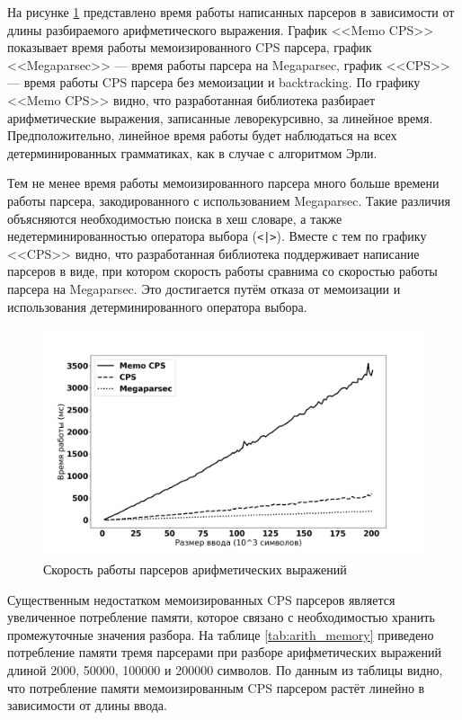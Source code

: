 \documentclass[times]{itmo-student-thesis}
\begin{document}
На рисунке \ref{fig:expr_plot} представлено время работы написанных парсеров в зависимости от длины разбираемого
арифметического выражения. График <<Memo CPS>> показывает время работы мемоизированного CPS парсера, график
<<Megaparsec>> --- время работы  парсера на Megaparsec,  график <<CPS>> --- время работы CPS парсера без мемоизации и
backtracking. По графику <<Memo CPS>> видно, что разработанная библиотека разбирает арифметические выражения, записанные 
леворекурсивно, за линейное время. Предположительно, линейное время работы будет наблюдаться на всех детерминированных грамматиках,
как в случае с алгоритмом Эрли.

Тем не менее время работы мемоизированного парсера много больше времени работы парсера,
закодированного с использованием Megaparsec. Такие различия объясняются необходимостью поиска в хеш словаре, а также 
недетерминированностью оператора выбора (\lstinline{<|>}). Вместе с тем по графику <<CPS>> видно, что разработанная библиотека
поддерживает написание парсеров в виде, при котором скорость работы сравнима со скоростью работы парсера на Megaparsec. Это
достигается путём отказа от мемоизации и использования детерминированного оператора выбора.

\begin{figure}[!h]
  \caption{Скорость работы парсеров арифметических выражений}\label{fig:expr_plot}
  \includegraphics[width=0.8\paperwidth]{./images/megaparsec_comparison.png}
\end{figure}

Существенным недостатком мемоизированных CPS парсеров является увеличенное потребление памяти, которое связано с
необходимостью хранить промежуточные значения разбора. На таблице \ref{tab:arith_memory} приведено потребление памяти
тремя парсерами при разборе арифметических выражений длиной 2000, 50000, 100000 и 200000 символов. По данным из таблицы
видно, что потребление памяти мемоизированным CPS парсером растёт линейно в зависимости от длины ввода.
\end{document}
